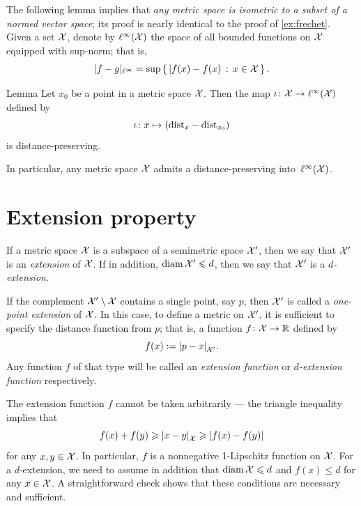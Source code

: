 The following lemma implies that {}\textit{any metric space is isometric to a subset of a normed vector space};
its proof is nearly identical to the proof of \ref{ex:frechet}.
Given a set $\mathcal{X}$, denote by $\ell^\infty(\mathcal{X})$ the space of all bounded functions on $\mathcal{X}$ equipped with sup-norm; 
that is,
\[|f-g|_{\ell^\infty}=\sup\left\{\,{|f(x)-f(x)}\,:\,{x\in \mathcal{X}}\,\right\}.\]

\begin{thm}{Lemma}\label{lem:kuratowski}
Let $x_0$ be a point in a metric space $\mathcal{X}$.
Then the map $\iota\colon\mathcal{X}\to \ell^\infty(\mathcal{X})$ defined by 
\[\iota\colon x\mapsto (\mathrm{dist}_x-\mathrm{dist}_{x_0})\]
is distance-preserving.

In particular, any metric space $\mathcal{X}$ admits a distance-preserving into~$\ell^\infty(\mathcal{X})$.
\end{thm}


\section{Extension property}
\label{sec:Extension property}

If a metric space $\mathcal{X}$ is a subspace of a semimetric space $\mathcal{X}'$, then we say that $\mathcal{X}'$ is an \emph{extension} of $\mathcal{X}$.
If in addition, $\operatorname{\rm diam}\nolimits\mathcal{X}'\leqslant d$, then we say that $\mathcal{X}'$ is a {}\emph{$d$-extension}.

If the complement $\mathcal{X}'\setminus \mathcal{X}$ contains a single point, say $p$, then $\mathcal{X}'$ is called a \emph{one-point extension} of $\mathcal{X}$.
In this case, to define a metric on $\mathcal{X}'$, it is sufficient to specify the distance function from $p$; that is, a function $f\colon\mathcal{X}\to\mathbb{R}$ defined by 
\[f(x)\df\dist{p}{x}{\spc{X}'}.\]
Any function $f$ of that type will be called an \emph{extension function}\label{page:extension function} or {}\emph{$d$-extension function} respectively.

The extension function $f$ cannot be taken arbitrarily --- the triangle inequality implies that 
\[f(x)+f(y)\ge \dist{x}{y}{\spc{X}}\ge |f(x)-f(y)|\]
for any $x,y\in \mathcal{X}$.
In particular, $f$ is a nonnegative 1-Lipschitz function on $\mathcal{X}$.
For a $d$-extension, we need to assume in addition that $\diam\spc{X}\z\le d$ and $f(x)\le d$ for any $x\in \mathcal{X}$.
A straightforward check shows that these conditions are necessary and sufficient.

